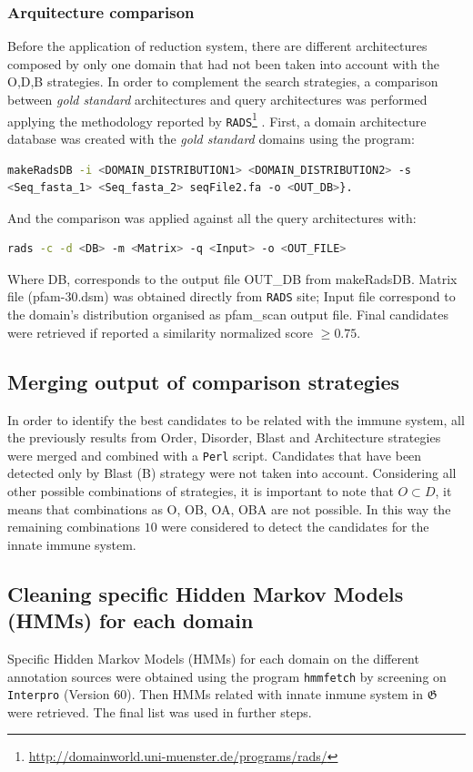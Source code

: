 \documentclass[11pt]{article}
\begin{document}
\subsubsection*{\textbf{A}rquitecture comparison}
Before the application of reduction system, there are different 
architectures composed by only one domain that had not been taken into account 
with the O,D,B strategies. In order to complement the search strategies, a
comparison between \textsl{gold standard} architectures and query architectures 
was performed applying the methodology reported 
by 
\texttt{RADS}\footnote{\url{http://domainworld.uni-muenster.de/programs/rads/} 
} \cite{Terrapon:2014}. First, a domain architecture database was created 
with the \textsl{gold standard} domains using the program: 
\begin{lstlisting}[language=bash, breaklines=true]
makeRadsDB -i <DOMAIN_DISTRIBUTION1> <DOMAIN_DISTRIBUTION2> -s 
<Seq_fasta_1> <Seq_fasta_2> seqFile2.fa -o <OUT_DB>}. 
\end{lstlisting} 
And the comparison was applied against all the query architectures with: 
\begin{lstlisting}[language=bash, breaklines=true]
rads -c -d <DB> -m <Matrix> -q <Input> -o <OUT_FILE>
\end{lstlisting}
Where DB, corresponds to the output file OUT\_DB from makeRadsDB. Matrix file 
(pfam-30.dsm) was obtained directly from \texttt{RADS} site; Input file 
correspond to the domain's distribution organised as pfam\_scan output 
file. Final candidates were retrieved if reported a similarity normalized score 
$\geq 0.75$.

\subsection*{Merging output of comparison strategies}
In order to identify the best candidates to be related with the immune 
system, all the previously results from Order, Disorder, Blast and Architecture 
strategies were merged and combined with a \texttt{Perl} script. Candidates 
that have been detected only by Blast (B) strategy were not taken into 
account. Considering all other possible combinations of strategies, it is 
important to note that $O \subset D$, it means that combinations as O, OB, OA, 
OBA are not possible. In this way the remaining combinations $10$ were 
considered to detect the candidates for the innate immune system.

\subsection*{Cleaning specific Hidden Markov Models (HMMs) for each 
domain}
Specific Hidden Markov Models (HMMs) for each domain on the different 
annotation sources were obtained using the program \texttt{hmmfetch} by 
screening on \texttt{Interpro} (Version 60). Then HMMs related with innate 
inmune system in $\boldsymbol{\mathfrak{G}}$ were retrieved. The final list was 
used in further steps.
\end{document}
